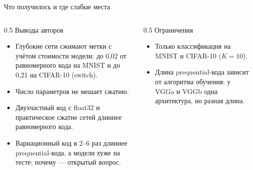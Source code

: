 \documentclass[aspectratio=169,10pt]{beamer}
\begin{document}
\begin{frame}{Что получилось и где слабые места}
  \small
  \begin{columns}[T]
    \begin{column}{0.5\textwidth}
      \textcolor{structure}{Выводы авторов}
      \begin{itemize}
        \item Глубокие сети сжимают метки с учётом стоимости модели: до 0,02 от равномерного кода на MNIST и до 0,21 на CIFAR-10 (switch).
        \item Число параметров не мешает сжатию.
        \item Двухчастный код с float32 и практическое сжатие сетей длиннее равномерного кода.
        \item Вариационный код в 2--6 раз длиннее prequential-кода, а модели хуже на тесте; почему --- открытый вопрос.
      \end{itemize}
    \end{column}
    \begin{column}{0.5\textwidth}
      \textcolor{structure}{Ограничения}
      \begin{itemize}
        \item Только классификация на MNIST и CIFAR-10 ($K=10$).
        \item Длина prequential-кода зависит от алгоритма обучения: у VGGa и VGGb одна архитектура, но разная длина.
      \end{itemize}
    \end{column}
  \end{columns}
\end{frame}
\end{document}
